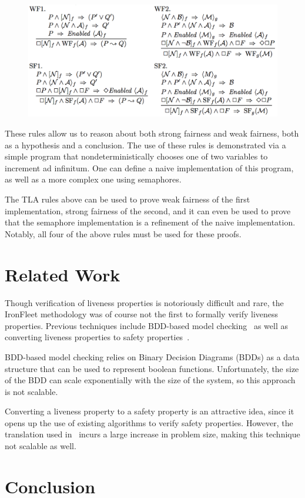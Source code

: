 \documentclass{llncs}
\begin{document}
\begin{figure}
\includegraphics[scale=0.6]{tla-rules}
\centering
\end{figure}

These rules allow us to reason about both strong fairness and weak fairness,
both as a hypothesis and a conclusion. The use of these rules is demonstrated
via a simple program that nondeterministically chooses one of two variables to
increment ad infinitum. One can define a naive implementation of this program,
as well as a more complex one using semaphores.

The TLA rules above can be used to prove weak fairness of the first
implementation, strong fairness of the second, and it can even be used to prove
that the semaphore implementation is a refinement of the naive implementation.
Notably, all four of the above rules must be used for these proofs.


\section{Related Work}\label{sec:rel-work}
Though verification of liveness properties is notoriously difficult and rare,
the IronFleet methodology was of course not the first to formally verify
liveness properties. Previous techniques include BDD-based model
checking~\cite{Ravi2000} as well as converting liveness properties to safety
properties~\cite{Schuppan2006}.

BDD-based model checking relies on Binary Decision Diagrams (BDDs) as a data
structure that can be used to represent boolean functions. Unfortunately, the
size of the BDD can scale exponentially with the size of the system, so this
approach is not scalable.

Converting a liveness property to a safety property is an attractive idea, since
it opens up the use of existing algorithms to verify safety properties. However,
the translation used in~\cite{Schuppan2006} incurs a large increase in problem
size, making this technique not scalable as well.

\section{Conclusion}

%
%



\end{document}
